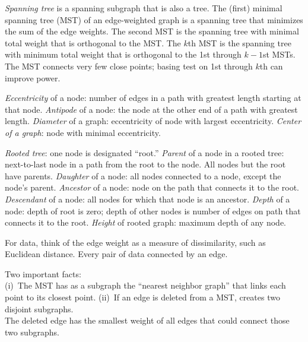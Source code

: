 \documentclass[landscape]{slides}
\begin{document}
\begin{slide}
\begin{slide}
{\em Spanning tree\/} is a spanning subgraph that is also a tree.
The (first) minimal spanning tree (MST) of an edge-weighted graph 
is a spanning tree that minimizes the sum of the edge weights.
The second MST is the spanning tree with minimal total weight that is orthogonal
to the MST.
The $k$th MST is the spanning tree with minimum total weight that is orthogonal to
the 1st through $k-1$st MSTs. 
The MST connects very few close points; basing test on 1st through $k$th can improve
power.

\end{slide}

\begin{slide}

{\em Eccentricity\/} of a node: number of edges in a path with greatest length starting at that node.
{\em Antipode\/} of a node: the node at the other end of a path with greatest length.
{\em Diameter\/} of a graph: eccentricity of node with largest eccentricity.
{\em Center of a graph\/}: node with minimal eccentricity.

{\em Rooted tree\/}: one node is designated ``root.''
{\em Parent\/} of a node in a rooted tree: next-to-last node in a path from the root to the node.
All nodes but the root have parents.
{\em Daughter\/} of a node: all nodes connected to a node, except the node's parent.
{\em Ancestor\/} of a node: node on the path that connects it to the root.
{\em Descendant\/} of a node: all nodes for which that node is an ancestor.
{\em Depth\/} of a node: depth of root is zero; depth of other nodes is number of edges on path that
connects it to the root.
{\em Height\/} of rooted graph: maximum depth of any node. 

\end{slide}

\begin{slide}

For data, think of the edge weight as a measure of dissimilarity, such as Euclidean distance. 
Every pair of data connected by an edge.

Two important facts:\\
(i)~The MST has as a subgraph the ``nearest neighbor graph'' that links each point to its closest point.
(ii)~If an edge is deleted from a MST, creates two disjoint subgraphs.\\
The deleted edge has the smallest weight of all edges that could connect those two subgraphs.


\end{slide}
\end{slide}
\end{document}
